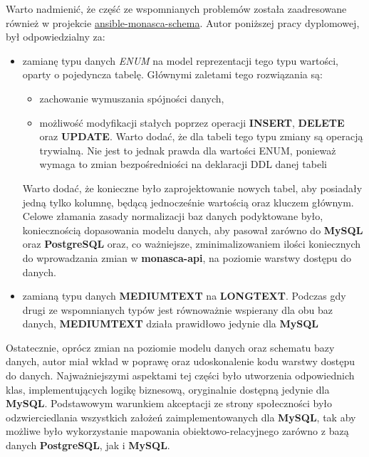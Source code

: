     Warto nadmienić, że część ze wspomnianych problemów została zaadresowane również
    w projekcie \href{https://github.com/FujitsuEnablingSoftwareTechnologyGmbH/ansible-monasca-schema}{ansible-monasca-schema}.
    Autor poniższej pracy dyplomowej, był odpowiedzialny za:
    \begin{itemize}
        \item zamianę typu danych \textit{ENUM} na model reprezentacji tego typu wartości, oparty
        o pojedyncza tabelę. Głównymi zaletami tego rozwiązania są:
        \begin{itemize}
            \item zachowanie wymuszania spójności danych,
            \item możliwość modyfikacji stałych poprzez operacji \textbf{INSERT}, \textbf{DELETE} oraz \textbf{UPDATE}. Warto
            dodać, że dla tabeli tego typu zmiany są operacją trywialną. Nie jest to jednak prawda dla wartości ENUM, ponieważ
            wymaga to zmian bezpośredniości na deklaracji DDL danej tabeli
        \end{itemize}
        Warto dodać, że konieczne było zaprojektowanie nowych tabel, aby posiadały jedną tylko kolumnę, będącą jednocześnie
        wartością oraz kluczem głównym. Celowe złamania zasady normalizacji baz danych podyktowane było, koniecznością
        dopasowania modelu danych, aby pasował zarówno do \textbf{MySQL} oraz \textbf{PostgreSQL} oraz, co ważniejsze,
        zminimalizowaniem ilości koniecznych do wprowadzania zmian w \textbf{monasca-api}, na poziomie warstwy dostępu do danych.
        \item zamianą typu danych \textbf{MEDIUMTEXT} na \textbf{LONGTEXT}. Podczas gdy drugi ze wspomnianych typów jest równoważnie
        wspierany dla obu baz danych, \textbf{MEDIUMTEXT} działa prawidłowo jedynie dla \textbf{MySQL}
    \end{itemize}
    
    Ostatecznie, oprócz zmian na poziomie modelu danych oraz schematu bazy danych, autor miał wkład w poprawę oraz udoskonalenie
    kodu warstwy dostępu do danych. Najważniejszymi aspektami tej części było utworzenia odpowiednich klas, implementujących logikę
    biznesową, oryginalnie dostępną jedynie dla \textbf{MySQL}. Podstawowym warunkiem akceptacji ze strony społeczności było
    odzwierciedlania wszystkich założeń zaimplementowanych dla \textbf{MySQL}, tak aby możliwe było wykorzystanie mapowania obiektowo-relacyjnego
    zarówno z bazą danych \textbf{PostgreSQL}, jak i \textbf{MySQL}.
    
